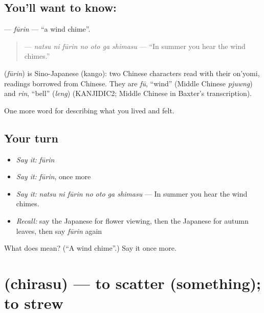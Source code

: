 \subsection*{You'll want to know: }
\textbf{} — \emph{fūrin} — \textquotedblleft{}a wind chime\textquotedblright{}.

\begin{quote}
\textbf{   } — \emph{natsu ni fūrin no oto ga shimasu} — \textquotedblleft{}In summer you hear the wind chimes.\textquotedblright{}
\end{quote}

\begin{cousinweb}
\textbf{} (\emph{fūrin}) is Sino-Japanese (kango): two Chinese characters read with their on'yomi, readings borrowed from Chinese. They are \emph{fū}, \textquotedblleft{}wind\textquotedblright{} (Middle Chinese \emph{pjuwng}) and \emph{rin}, \textquotedblleft{}bell\textquotedblright{} (\emph{leng}) (KANJIDIC2; Middle Chinese in Baxter's transcription).
\end{cousinweb}

\begin{grammarlens}[title={What you've built}]
One more word for describing what you lived and felt.
\end{grammarlens}

\subsection*{Your turn}
\begin{itemize}
\raggedright
  \item \emph{Say it:} \emph{fūrin}
  \item \emph{Say it:} \emph{fūrin}, once more
  \item \emph{Say it:} \emph{natsu ni fūrin no oto ga shimasu} — In summer you hear the wind chimes.
  \item \emph{Recall:} say the Japanese for flower viewing, then the Japanese for autumn leaves, then say \emph{fūrin} again
\end{itemize}

\begin{tcolorbox}[breakable,colback=teal!4,colframe=teal!35!black,title={Before you move on}]
What does  mean? (\textquotedblleft{}A wind chime\textquotedblright{}.) Say it once more.
\end{tcolorbox}
\section[\texorpdfstring{\ja{ちらす} (chirasu)}{ちらす (chirasu)}]{ (chirasu) — to scatter (something); to strew}

